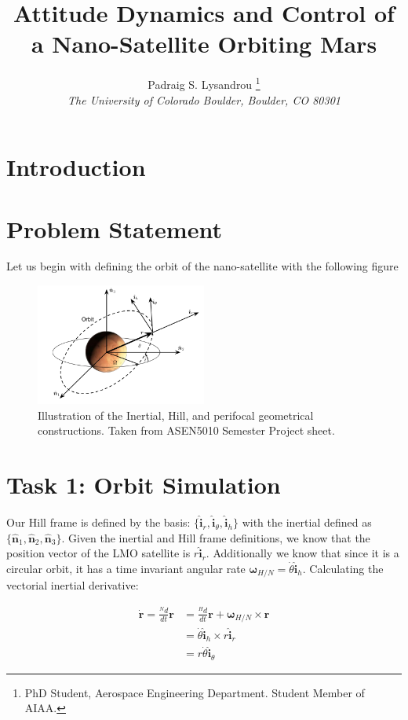 \documentclass[paper]{aiaaNew}
\title{Attitude Dynamics and Control of a Nano-Satellite Orbiting Mars}
\author{Padraig S. Lysandrou
  \thanks{PhD Student, Aerospace Engineering Department.  Student Member of AIAA.}
  \\
  \emph{\normalsize The University of Colorado Boulder, Boulder, CO 80301}
}
\begin{document}
\maketitle


\clearpage
\section{Introduction}

\section{Problem Statement}
Let us begin with defining the orbit of the nano-satellite with the following figure


\begin{figure}[!htbp] 
  \centering
  \includegraphics[width=0.5\textwidth]{Figures/framedef.PNG}
  \caption{Illustration of the Inertial, Hill, and perifocal geometrical constructions. Taken from ASEN5010 Semester Project sheet.}
  \label{fig:succ}
 \end{figure}



\section*{Task 1: Orbit Simulation}
Our Hill frame is defined by the basis: $\{\bm{\hat{i}}_r, \bm{\hat{i}}_\theta, \bm{\hat{i}}_h \}$ with the inertial defined as $\{\bm{\hat{n}}_1, \bm{\hat{n}}_2, \bm{\hat{n}}_3 \}$. Given the inertial and Hill frame definitions, we know that the position vector of the LMO satellite is $r\bm{\hat{i}}_r$. Additionally we know that since it is a circular orbit, it has a time invariant angular rate ${\bm{\omega}}_{H/N} = \dot{\theta}\mathbf{\hat{i}}_h$. Calculating the vectorial inertial derivative:

\begin{align}
	\dot{\bm{r}} = \frac{^N d}{dt}\bm{r} &= \frac{^H d}{dt}\bm{r} + \bm{\omega}_{H/N} \times \bm{r} \\
	&= \dot{\theta}\bm{\hat{i}}_h \times r\bm{\hat{i}}_r \\
	&= r\dot{\theta} \bm{\hat{i}}_\theta
\end{align}
\end{document}
